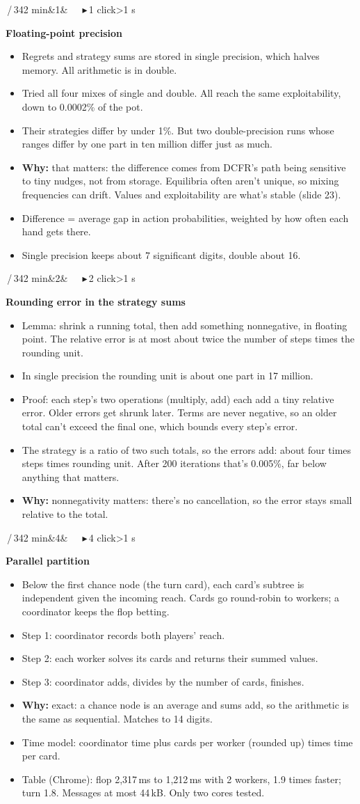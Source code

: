\documentclass{article}
\newcommand{\slide}[4]{\clearpage
  \noindent\colorbox{bar}{\parbox{\dimexpr\linewidth-2\fboxsep}{\color{white}\fontsize{13}{15}\selectfont
  \textbf{\fontsize{21}{23}\selectfont #1}\,/\,34\hfill #3\ifx&#4&\else\ \ \ \textcolor{ck!40!white}{\ensuremath{\blacktriangleright}}\,#4 click\ifnum#4>1 s\fi\fi\\[2pt]
  \raggedright\textbf{\fontsize{15}{17.5}\selectfont #2}}}\par\vspace{5pt}
  \fontsize{15}{17.8}\selectfont\raggedright}
\newcommand{\pt}{\item[\textbullet]}
\newcommand{\ck}{\item[\textcolor{ck}{\ensuremath{\blacktriangleright}}]}
\newcommand{\why}{\textcolor{why}{\textbf{Why:}} }
\begin{document}
\slide{16}{Floating-point precision}{2 min}{1}
\begin{itemize}
\pt Regrets and strategy sums are stored in single precision, which halves memory. All arithmetic is in double.
\ck Tried all four mixes of single and double. All reach the same exploitability, down to 0.0002\% of the pot.
\pt Their strategies differ by under 1\%. But two double-precision runs whose ranges differ by one part in ten million differ just as much.
\pt \why that matters: the difference comes from DCFR's path being sensitive to tiny nudges, not from storage. Equilibria often aren't unique, so mixing frequencies can drift. Values and exploitability are what's stable (slide 23).
\pt Difference = average gap in action probabilities, weighted by how often each hand gets there.
\pt Single precision keeps about 7 significant digits, double about 16.
\end{itemize}

\slide{17}{Rounding error in the strategy sums}{2 min}{2}
\begin{itemize}
\pt Lemma: shrink a running total, then add something nonnegative, in floating point. The relative error is at most about twice the number of steps times the rounding unit.
\pt In single precision the rounding unit is about one part in 17 million.
\ck Proof: each step's two operations (multiply, add) each add a tiny relative error. Older errors get shrunk later. Terms are never negative, so an older total can't exceed the final one, which bounds every step's error.
\ck The strategy is a ratio of two such totals, so the errors add: about four times steps times rounding unit. After 200 iterations that's 0.005\%, far below anything that matters.
\pt \why nonnegativity matters: there's no cancellation, so the error stays small relative to the total.
\end{itemize}

\slide{18}{Parallel partition}{2 min}{4}
\begin{itemize}
\pt Below the first chance node (the turn card), each card's subtree is independent given the incoming reach. Cards go round-robin to workers; a coordinator keeps the flop betting.
\pt Step 1: coordinator records both players' reach.
\ck Step 2: each worker solves its cards and returns their summed values.
\ck Step 3: coordinator adds, divides by the number of cards, finishes.
\pt \why exact: a chance node is an average and sums add, so the arithmetic is the same as sequential. Matches to 14 digits.
\ck Time model: coordinator time plus cards per worker (rounded up) times time per card.
\ck Table (Chrome): flop 2,317\,ms to 1,212\,ms with 2 workers, 1.9 times faster; turn 1.8. Messages at most 44\,kB. Only two cores tested.
\end{itemize}
\end{document}
